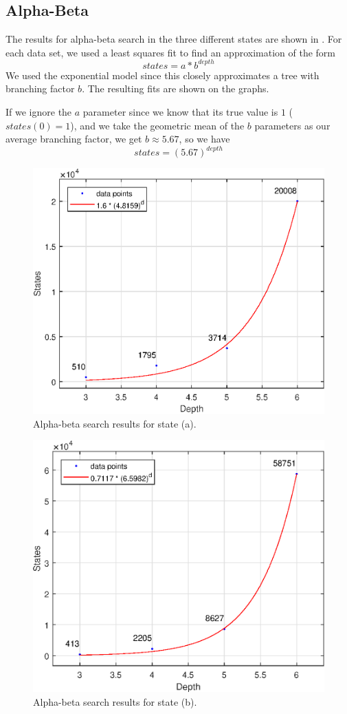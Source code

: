 \documentclass[journal,hidelinks]{IEEEtran}
\begin{document}
\subsection{Alpha-Beta}

The results for alpha-beta search in the three different states are shown in . For each data set, we used a least squares fit to find an approximation of the form
\[
states = a * b^{depth}
\]
We used the exponential model since this closely approximates a tree with branching factor $b$. The resulting fits are shown on the graphs.

If we ignore the $a$ parameter since we know that its true value is $1$ ($states(0) = 1$), and we take the geometric mean of the $b$ parameters as our average branching factor, we get $b \approx 5.67$, so we have
\[
states = (5.67)^{depth}
\]

\begin{figure}[!htb]
  \centering
  \includegraphics[width=0.6\columnwidth]{state-1/alpha-beta.eps}
  \caption{Alpha-beta search results for state (a).}
  \label{fig:state-1-alpha-beta}
\end{figure}

\begin{figure}[!htb]
  \centering
  \includegraphics[width=0.6\columnwidth]{state-2/alpha-beta.eps}
  \caption{Alpha-beta search results for state (b).}
  \label{fig:state-2-alpha-beta}
\end{figure}
\end{document}
